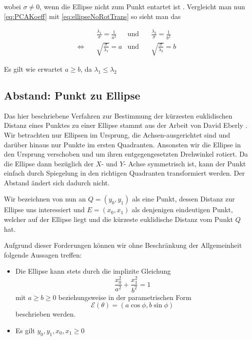 wobei $\sigma \neq 0$, wenn die Ellipse nicht zum Punkt entartet ist \cite{Lawrence1972}. Vergleicht man nun \ref{eq:PCAKoeff} mit \ref{eq:ellipseNoRotTrans} so sieht man das

\begin{equation}
\begin{aligned}
&\frac{\lambda_1}{\sigma} = \frac{1}{a^2} &\text{und}\quad &\frac{\lambda_2}{\sigma} = \frac{1}{b^2}\\
\Leftrightarrow\quad & \sqrt{\frac{\sigma}{\lambda_1}}  = a  &\text{und}\quad & \sqrt{\frac{\sigma}{\lambda_2}}  = b
\end{aligned}
\end{equation}

Es gilt wie erwartet $a \geq b$, da $\lambda_1 \leq \lambda_2$


\subsection{Abstand: Punkt zu Ellipse}
\label{sc:distPointEllipse}
Das hier beschriebene Verfahren zur Bestimmung der kürzesten euklidischen Distanz eines Punktes zu einer Ellipse stammt aus der Arbeit von David Eberly \cite{Eberly2013}.
Wir betrachten nur Ellipsen im Ursprung, die Achsen-ausgerichtet sind und darüber hinaus nur Punkte im ersten Quadranten. Ansonsten wir die Ellipse in den Ursprung verschoben und um ihren entgegengesetzten Drehwinkel rotiert. Da die Ellipse dann bezüglich der $X$- und $Y$- Achse symmetrisch ist, kann der Punkt einfach durch Spiegelung in den richtigen Quadranten transformiert werden. Der Abstand ändert sich dadurch nicht. 

Wir bezeichnen von nun an $Q = (y_0, y_1)$ als eine Punkt, dessen Distanz zur Ellipse uns interessiert und $E = (x_0, x_1)$ als denjenigen eindeutigen Punkt, welcher auf der Ellipse liegt und die kürzeste euklidische Distanz vom Punkt $Q$ hat. 

Aufgrund dieser Forderungen können wir ohne Beschränkung der Allgemeinheit folgende Aussagen treffen:
\begin{itemize}
	\item Die Ellipse kann stets durch die implizite Gleichung \[\frac{x_0^2}{a^2} + \frac{x_1^2}{b^2} = 1\] mit $a \geq b \geq 0$ beziehungsweise
	in der parametrischen Form \[\mathcal{E}(\theta) = (a\cos\phi, b\sin\phi)  \tag*{$\phi \in [0, 2\pi)$}\] beschrieben werden.
	\item Es gilt $y_0,y_1,x_0, x_1 \geq 0$
\end{itemize}

